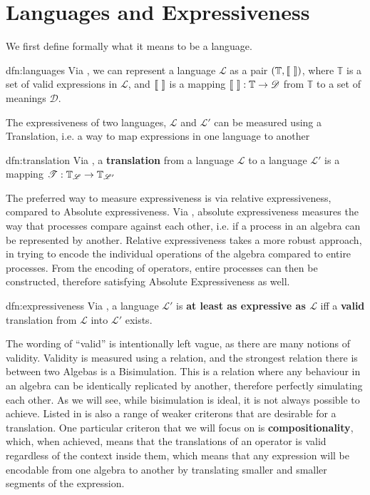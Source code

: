 \documentclass[../hons_project.tex]{subfiles}
\begin{document}
    
\section{Languages and Expressiveness}\label{ssec:language}

We first define formally what it means to be a language.
\begin{dfn}[Languages]{dfn:languages}{}
   Via \cite{DBLP:conf/fossacs/Glabbeek18}, we can represent a language $\mathscr{L}$ as a pair $(\mathbb{T}, \llbracket \,\, \rrbracket)$, where $\mathbb{T}$ is a set of valid expressions in $\mathscr{L}$, and $\llbracket \,\, \rrbracket$ is a mapping $\llbracket \,\, \rrbracket : \mathbb{T} \to \mathscr{D}$ from $\mathbb{T}$ to a set of meanings $\mathscr{D}$.
\end{dfn}

The expressiveness of two languages, $\mathscr{L}$ and $\mathscr{L}'$ can be measured using a Translation, i.e. a way to map expressions in one language to another
\begin{dfn}[Translation]{dfn:translation}{}
   Via  \cite{DBLP:conf/fossacs/Glabbeek18}, a \textbf{translation} from a language $\mathscr{L}$ to a language $\mathscr{L'}$ is a mapping $\mathscr{T} : \mathbb{T}_{\mathscr{L}} \to \mathbb{T}_{\mathscr{L}'}$
\end{dfn}



The preferred way to measure expressiveness is via relative expressiveness, compared to Absolute expressiveness. Via \cite{parrowExpressivenessProcessAlgebras2008}, absolute expressiveness measures the way that processes compare against each other, i.e. if a process in an algebra can be represented by another. Relative expressiveness takes a more robust approach, in trying to encode the individual operations of the algebra compared to entire processes. From the encoding of operators, entire processes can then be constructed, therefore satisfying Absolute Expressiveness as well.

\begin{dfn}[Expressiveness]{dfn:expressiveness}{}
   Via  \cite{DBLP:conf/fossacs/Glabbeek18}, a language $\mathscr{L}'$ is \textbf{at least as expressive as $\mathscr{L}$} iff a \textbf{valid} translation from $\mathscr{L}$ into $\mathscr{L}'$ exists.
\end{dfn}

The wording of ``valid'' is intentionally left vague, as there are many notions of validity. Validity is measured using a relation, and the strongest relation there is between two Algebas is a Bisimulation. This is a relation where any behaviour in an algebra can be identically replicated by another, therefore perfectly simulating each other. As we will see, while bisimulation is ideal, it is not always possible to achieve. Listed in \cite{parrowExpressivenessProcessAlgebras2008} is also a range of weaker criterons that are desirable for a translation. One particular criteron that we will focus on is \textbf{compositionality}, which, when achieved, means that the translations of an operator is valid regardless of the context inside them, which means that any expression will be encodable from one algebra to another by translating smaller and smaller segments of the expression.
\end{document}
